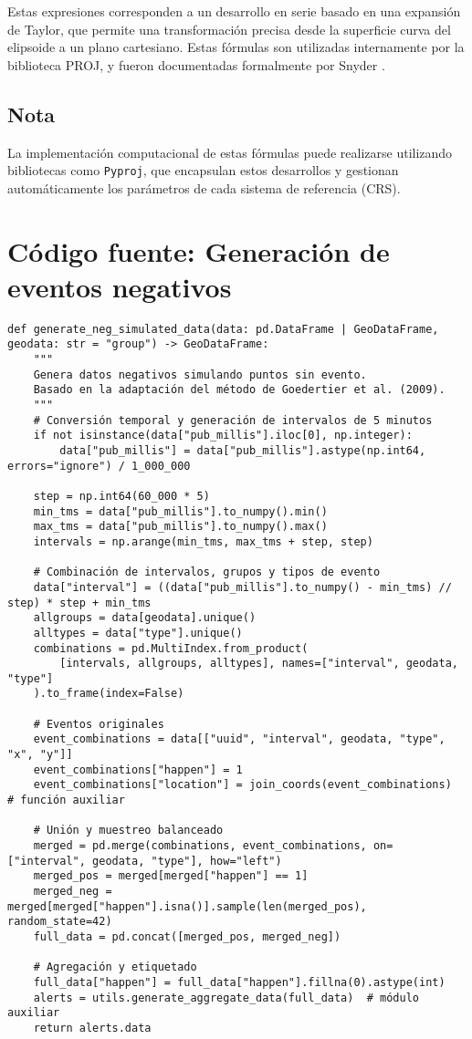 \documentclass[12pt]{article}
\begin{document}
Estas expresiones corresponden a un desarrollo en serie basado en una expansión de Taylor, que permite una transformación precisa desde la superficie curva del elipsoide a un plano cartesiano. Estas fórmulas son utilizadas internamente por la biblioteca PROJ, y fueron documentadas formalmente por Snyder \citep{snyder_tm}.

\subsection*{Nota}

La implementación computacional de estas fórmulas puede realizarse utilizando bibliotecas como \texttt{Pyproj}, que encapsulan estos desarrollos y gestionan automáticamente los parámetros de cada sistema de referencia (CRS).

\section{Código fuente: Generación de eventos negativos}
\label{annex:neg_code}

\begin{verbatim}
def generate_neg_simulated_data(data: pd.DataFrame | GeoDataFrame, geodata: str = "group") -> GeoDataFrame:
    """
    Genera datos negativos simulando puntos sin evento.
    Basado en la adaptación del método de Goedertier et al. (2009).
    """
    # Conversión temporal y generación de intervalos de 5 minutos
    if not isinstance(data["pub_millis"].iloc[0], np.integer):
        data["pub_millis"] = data["pub_millis"].astype(np.int64, errors="ignore") / 1_000_000

    step = np.int64(60_000 * 5)
    min_tms = data["pub_millis"].to_numpy().min()
    max_tms = data["pub_millis"].to_numpy().max()
    intervals = np.arange(min_tms, max_tms + step, step)

    # Combinación de intervalos, grupos y tipos de evento
    data["interval"] = ((data["pub_millis"].to_numpy() - min_tms) // step) * step + min_tms
    allgroups = data[geodata].unique()
    alltypes = data["type"].unique()
    combinations = pd.MultiIndex.from_product(
        [intervals, allgroups, alltypes], names=["interval", geodata, "type"]
    ).to_frame(index=False)

    # Eventos originales
    event_combinations = data[["uuid", "interval", geodata, "type", "x", "y"]]
    event_combinations["happen"] = 1
    event_combinations["location"] = join_coords(event_combinations)  # función auxiliar

    # Unión y muestreo balanceado
    merged = pd.merge(combinations, event_combinations, on=["interval", geodata, "type"], how="left")
    merged_pos = merged[merged["happen"] == 1]
    merged_neg = merged[merged["happen"].isna()].sample(len(merged_pos), random_state=42)
    full_data = pd.concat([merged_pos, merged_neg])

    # Agregación y etiquetado
    full_data["happen"] = full_data["happen"].fillna(0).astype(int)
    alerts = utils.generate_aggregate_data(full_data)  # módulo auxiliar
    return alerts.data
\end{verbatim}
\end{document}
